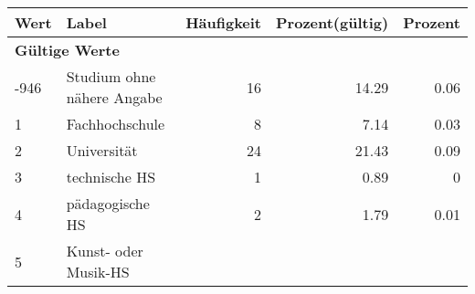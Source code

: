      \begin{longtable}{lXrrr}
     \toprule
     \textbf{Wert} & \textbf{Label} & \textbf{Häufigkeit} & \textbf{Prozent(gültig)} & \textbf{Prozent} \\
     \endhead
     \midrule
     \multicolumn{5}{l}{\textbf{Gültige Werte}}\\

     -946 &
     \multicolumn{1}{X}{ Studium ohne nähere Angabe   } &


       \num{16} &
       \num[round-mode=places,round-precision=2]{14,29} &
         \num[round-mode=places,round-precision=2]{0,06} \\

     1 &
     \multicolumn{1}{X}{ Fachhochschule   } &


       \num{8} &
       \num[round-mode=places,round-precision=2]{7,14} &
         \num[round-mode=places,round-precision=2]{0,03} \\

     2 &
     \multicolumn{1}{X}{ Universität   } &


       \num{24} &
       \num[round-mode=places,round-precision=2]{21,43} &
         \num[round-mode=places,round-precision=2]{0,09} \\

     3 &
     \multicolumn{1}{X}{ technische HS   } &


       \num{1} &
       \num[round-mode=places,round-precision=2]{0,89} &
         \num[round-mode=places,round-precision=2]{0} \\

     4 &
     \multicolumn{1}{X}{ pädagogische HS   } &


       \num{2} &
       \num[round-mode=places,round-precision=2]{1,79} &
         \num[round-mode=places,round-precision=2]{0,01} \\

     5 &
     \multicolumn{1}{X}{ Kunst- oder Musik-HS   } &



\end{longtable}
